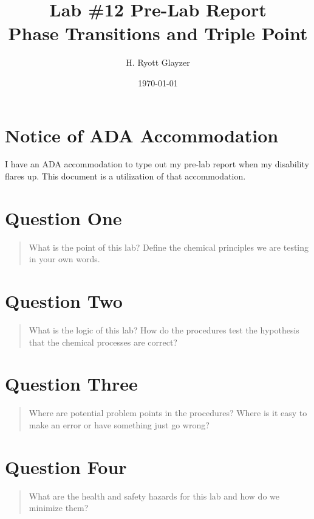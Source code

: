 \documentclass[11pt, letterpaper]{article}
\begin{document}


\title{Lab \#12 Pre-Lab Report \\ \large Phase Transitions and Triple Point}
\author{H. Ryott Glayzer}
\date{\today}


\maketitle


\section*{Notice of ADA Accommodation}
I have an ADA accommodation to type out my pre-lab report when my disability flares up.
This document is a utilization of that accommodation.

\section{Question One}
\begin{quote}
    What is the point of this lab? Define the chemical principles we are testing in your own words.
\end{quote}






\section{Question Two}
\begin{quote}
    What is the logic of this lab? How do the procedures test the hypothesis that the chemical 
    processes are correct?
\end{quote}






\section{Question Three}
\begin{quote}
    Where are potential problem points in the procedures? Where is it easy to make an error 
    or have something just go wrong?
\end{quote}






\section{Question Four}
\begin{quote}
    What are the health and safety hazards for this lab and how do we minimize them?
\end{quote}
\end{document}
